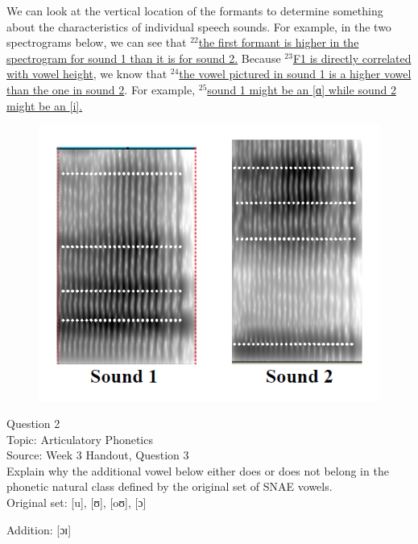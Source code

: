 \documentclass[12pt]{article}
\begin{document}
We can look at the vertical location of the formants to determine something about the characteristics of individual speech sounds. For example, in the two spectrograms below, we can see that $^{22}$\ul{the first formant is higher in the spectrogram for sound 1 than it is for sound 2.} Because $^{23}$\ul{F1 is directly correlated with vowel height}, we know that $^{24}$\ul{the vowel pictured in sound 1 is a higher vowel than the one in sound 2}. For example, $^{25}$\ul{sound 1 might be an {[ɑ]} while sound 2 might be an {[i]}.}

\begin{figure}[H]
\includegraphics{../images/sound1a_sound2i.png}
\end{figure}

\newpage

{\large Question 2}\\

Topic: Articulatory Phonetics\\
Source: Week 3 Handout, Question 3\\

Explain why the additional vowel below either does or does not belong in the phonetic natural class defined by the original set of SNAE vowels.\\

Original set: {[u]}, {[ʊ]}, {[oʊ]}, {[ɔ]}

Addition: {[ɔɪ]}


\newpage

\begin{center}
\textbf{{\color{red}{\HUGE END OF EXAM}}}\\

\end{center}
\newpage
\end{document}
